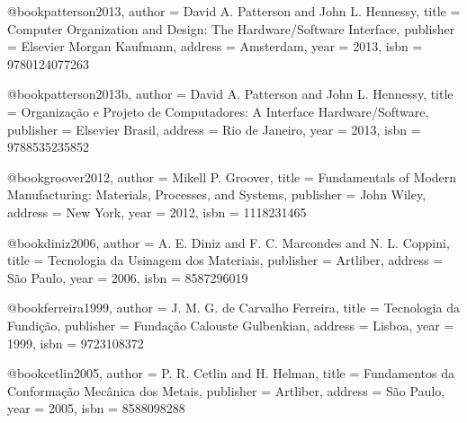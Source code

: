 @book{patterson2013,
  author = {David A. Patterson and John L. Hennessy},
  title = {Computer Organization and Design: The Hardware/Software Interface},
  publisher = {Elsevier Morgan Kaufmann},
  address = {Amsterdam},
  year = {2013},
  isbn = {9780124077263}
}

@book{patterson2013b,
  author = {David A. Patterson and John L. Hennessy},
  title = {Organização e Projeto de Computadores: A Interface Hardware/Software},
  publisher = {Elsevier Brasil},
  address = {Rio de Janeiro},
  year = {2013},
  isbn = {9788535235852}
}

%

@book{groover2012,
  author = {Mikell P. Groover},
  title = {Fundamentals of Modern Manufacturing: Materials, Processes, and Systems},
  publisher = {John Wiley},
  address = {New York},
  year = {2012},
  isbn = {1118231465}
}

@book{diniz2006,
  author = {A. E. Diniz and F. C. Marcondes and N. L. Coppini},
  title = {Tecnologia da Usinagem dos Materiais},
  publisher = {Artliber},
  address = {São Paulo},
  year = {2006},
  isbn = {8587296019}
}

@book{ferreira1999,
  author = {J. M. G. de Carvalho Ferreira},
  title = {Tecnologia da Fundição},
  publisher = {Fundação Calouste Gulbenkian},
  address = {Lisboa},
  year = {1999},
  isbn = {9723108372}
}

@book{cetlin2005,
  author = {P. R. Cetlin and H. Helman},
  title = {Fundamentos da Conformação Mecânica dos Metais},
  publisher = {Artliber},
  address = {São Paulo},
  year = {2005},
  isbn = {8588098288}
}

